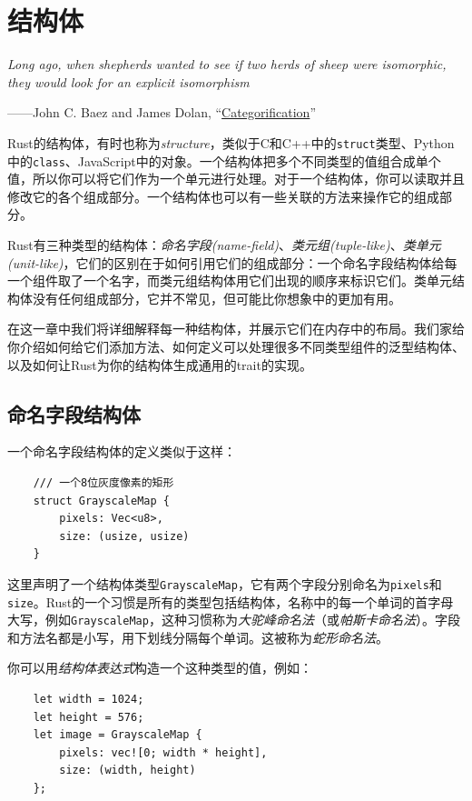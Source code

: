 \chapter{结构体}\label{ch09}

\emph{Long ago, when shepherds wanted to see if two herds of sheep were isomorphic, they would look for an explicit isomorphism}

\begin{flushright}
    ——John C. Baez and James Dolan, “\href{https://arxiv.org/abs/math/9802029}{Categorification}”
\end{flushright}

Rust的结构体，有时也称为\emph{structure}，类似于C和C++中的\texttt{struct}类型、Python中的\texttt{class}、JavaScript中的对象。一个结构体把多个不同类型的值组合成单个值，所以你可以将它们作为一个单元进行处理。对于一个结构体，你可以读取并且修改它的各个组成部分。一个结构体也可以有一些关联的方法来操作它的组成部分。

Rust有三种类型的结构体：\emph{命名字段(name-field)}、\emph{类元组(tuple-like)}、\emph{类单元(unit-like)}，它们的区别在于如何引用它们的组成部分：一个命名字段结构体给每一个组件取了一个名字，而类元组结构体用它们出现的顺序来标识它们。类单元结构体没有任何组成部分，它并不常见，但可能比你想象中的更加有用。

在这一章中我们将详细解释每一种结构体，并展示它们在内存中的布局。我们家给你介绍如何给它们添加方法、如何定义可以处理很多不同类型组件的泛型结构体、以及如何让Rust为你的结构体生成通用的trait的实现。

\section{命名字段结构体}

一个命名字段结构体的定义类似于这样：
\begin{verbatim}
    /// 一个8位灰度像素的矩形
    struct GrayscaleMap {
        pixels: Vec<u8>,
        size: (usize, usize)
    }
\end{verbatim}

这里声明了一个结构体类型\texttt{GrayscaleMap}，它有两个字段分别命名为\texttt{pixels}和\texttt{size}。Rust的一个习惯是所有的类型包括结构体，名称中的每一个单词的首字母大写，例如\texttt{GrayscaleMap}，这种习惯称为\emph{大驼峰命名法}（或\emph{帕斯卡命名法}）。字段和方法名都是小写，用下划线分隔每个单词。这被称为\emph{蛇形命名法}。

你可以用\emph{结构体表达式}构造一个这种类型的值，例如：
\begin{verbatim}
    let width = 1024;
    let height = 576;
    let image = GrayscaleMap {
        pixels: vec![0; width * height],
        size: (width, height)
    };
\end{verbatim}

